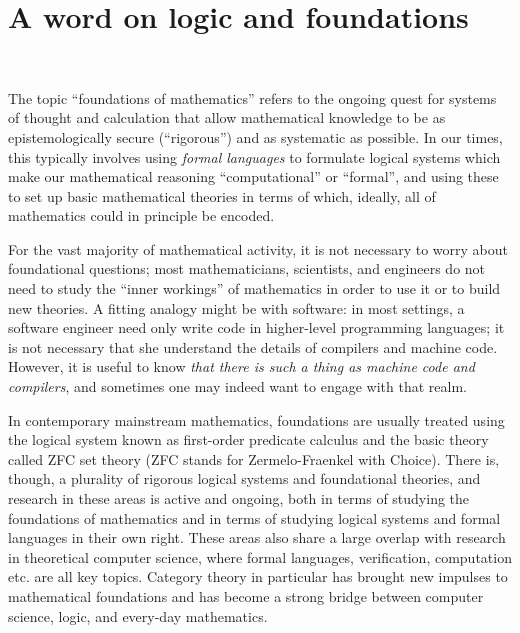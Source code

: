 

\section{A word on logic and foundations}



\

The topic ``foundations of mathematics'' refers to the ongoing quest for systems of thought and calculation that allow mathematical knowledge to be as epistemologically secure (``rigorous'') and as systematic as possible. In our times, this typically involves using \emph{formal languages} to formulate logical systems which make our mathematical reasoning ``computational'' or ``formal'', and using these to set up basic mathematical theories in terms of which, ideally, all of mathematics could in principle be encoded. 

For the vast majority of mathematical activity, it is not necessary to worry about foundational questions; most mathematicians, scientists, and engineers do not need to study the ``inner workings'' of mathematics in order to use it or to build new theories. A fitting analogy might be with software: in most settings, a software engineer need only write code in higher-level programming languages; it is not necessary that she understand the details of compilers and machine code. However, it is useful to know \emph{that there is such a thing as machine code and compilers}, and sometimes one may indeed want to engage with that realm. 

In contemporary mainstream mathematics, foundations are usually treated using the logical system known as first-order predicate calculus and the basic theory called ZFC set theory (ZFC stands for Zermelo-Fraenkel with Choice). There is, though, a plurality of rigorous logical systems and foundational theories, and research in these areas is active and ongoing, both in terms of studying the foundations of mathematics and in terms of studying logical systems and formal languages in their own right. These areas also share a large overlap with research in theoretical computer science, where formal languages, verification, computation etc. are all key topics. Category theory in particular has brought new impulses to mathematical foundations and has become a strong bridge between computer science, logic, and every-day mathematics. 

